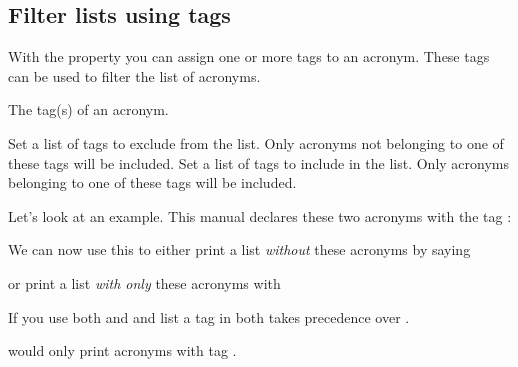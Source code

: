 \documentclass{acro-manual}
\begin{document}
\subsection{Filter lists using tags}\label{sec:lists-tags}
With the property  you can assign one or more tags to an
acronym.  These tags can be used to filter the list of acronyms.
\begin{properties}
  \Default
    The tag(s) of an acronym.
\end{properties}
\begin{options}
  \Default
    Set a list of tags to exclude from the list.  Only acronyms not
    belonging to one of these tags will be included.
  \Default
    Set a list of tags to include in  the list.  Only acronyms belonging to
    one of these tags will be included.
\end{options}
  
Let's look at an example. This manual declares these two acronyms with the tag
:
\begin{sourcecode}
\end{sourcecode}
We can now use this to either print a list \emph{without} these acronyms by
saying
\begin{sourcecode}
  \printacronyms[exclude=city]
\end{sourcecode}
or print a list \emph{with only} these acronyms with
\begin{example}
  \printacronyms[include=city,heading=none]
\end{example}
\begin{bewareofthedog}
  If you use both  and  and list a tag in both
   takes precedence over .
  \begin{sourcecode}
  \printacronyms[exclude={a,b},include={b,c}]
  \end{sourcecode}
  would only print acronyms with tag .
\end{bewareofthedog}
\end{document}
